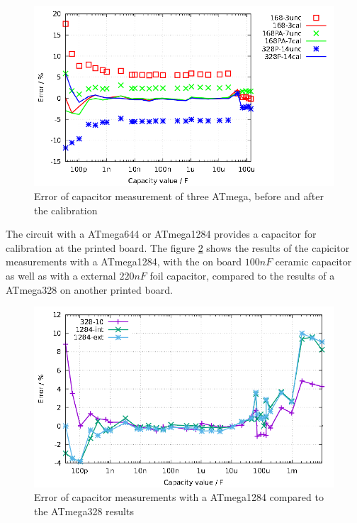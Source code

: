 \begin{figure}[H]
\centering
\includegraphics[width=16cm]{../GNU/MegaAuto.pdf}
\caption{Error of capacitor measurement of three ATmega, before and after the calibration}
\label{fig:MegaAuto}
\end{figure}

The circuit with a ATmega644 or ATmega1284 provides a capacitor for calibration at the printed board.
The figure \ref{fig:Mega1284} shows the results of the capicitor measurements with a ATmega1284,
with the on board \(100nF\) ceramic capacitor as well as with a external \(220nF\) foil capacitor, compared
to the results of a ATmega328 on another printed board.

\begin{figure}[H]
\centering
\includegraphics[width=16cm]{../GNU/Mega1284.pdf}
\caption{Error of capacitor measurements with a ATmega1284 compared to the ATmega328 results}
\label{fig:Mega1284}
\end{figure}

